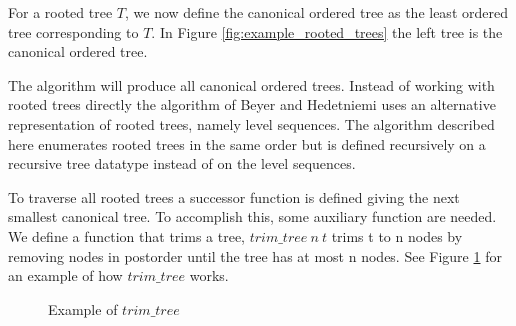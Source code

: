 For a rooted tree $T$, we now define the canonical ordered tree as the least ordered tree corresponding to $T$.
In Figure \ref{fig:example_rooted_trees} the left tree is the canonical ordered tree.

The algorithm will produce all canonical ordered trees.
Instead of working with rooted trees directly the algorithm of Beyer and Hedetniemi uses an alternative representation of rooted trees, namely level sequences.
The algorithm described here enumerates rooted trees in the same order but is defined recursively on a recursive tree datatype instead of on the level sequences.

To traverse all rooted trees a successor function is defined giving the next smallest canonical tree.
To accomplish this, some auxiliary function are needed.
We define a function that trims a tree, $trim\_tree\ n\ t$ trims t to n nodes by removing nodes in postorder until the tree has at most n nodes.
See Figure \ref{fig:trim_tree_example} for an example of how $trim\_tree$ works.

\begin{figure}[htpb]
\centering
{}
\caption{Example of $trim\_tree$}
\label{fig:trim_tree_example}
\end{figure}

